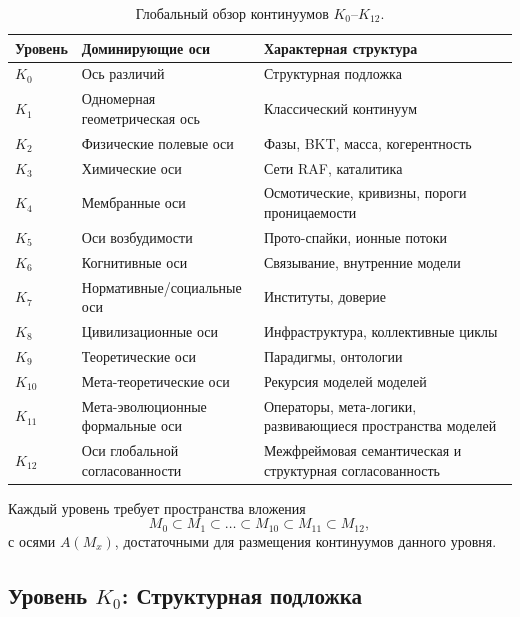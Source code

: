 \begin{table}[h!]
\centering
\begingroup
\footnotesize
\RaggedRight
\setlength{\tabcolsep}{4pt}
\begin{tabular}{@{}L{0.10\textwidth}L{0.25\textwidth}L{0.49\textwidth}@{}}
\hline
Уровень & Доминирующие оси & Характерная структура \\
\hline
\(K_0\) & Ось различий & Структурная подложка \\
\(K_1\) & Одномерная геометрическая ось & Классический континуум \\
\(K_2\) & Физические полевые оси & Фазы, BKT, масса, когерентность \\
\(K_3\) & Химические оси & Сети RAF, каталитика \\
\(K_4\) & Мембранные оси & Осмотические, кривизны, пороги проницаемости \\
\(K_5\) & Оси возбудимости & Прото-спайки, ионные потоки \\
\(K_6\) & Когнитивные оси & Связывание, внутренние модели \\
\(K_7\) & Нормативные/социальные оси & Институты, доверие \\
\(K_8\) & Цивилизационные оси & Инфраструктура, коллективные циклы \\
\(K_9\) & Теоретические оси & Парадигмы, онтологии \\
\(K_{10}\) & Мета-теоретические оси & Рекурсия моделей моделей \\
\(K_{11}\) & Мета-эволюционные формальные оси & Операторы, мета-логики, развивающиеся пространства моделей \\
\(K_{12}\) & Оси глобальной согласованности & Межфреймовая семантическая и структурная согласованность \\
\hline
\end{tabular}
\endgroup
\caption{Глобальный обзор континуумов \texorpdfstring{\(K_0\)}{K0}–\(K_{12}\).}
\label{tab:klevels-summary}
\end{table}

Каждый уровень требует пространства вложения
\[
   M_0 \subset M_1 \subset \dots \subset M_{10} \subset M_{11} \subset M_{12},
\]
с осями \(A(M_x)\), достаточными для размещения континуумов данного уровня.


\subsection{Уровень \texorpdfstring{\texorpdfstring{$K_0$}{K\_0}}{K0}: Структурная подложка}

